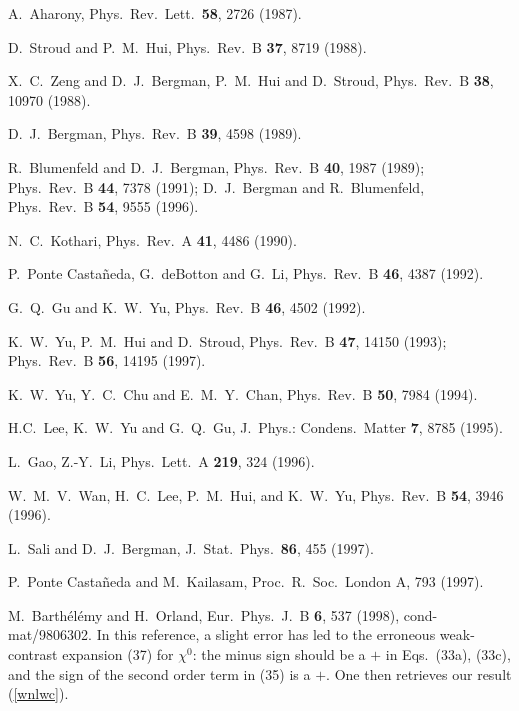 \begin{thebibliography}{99}
 A.\ Aharony, 
Phys.\ Rev.\ Lett.\ {\bf 58}, 2726 (1987).  

 D.\ Stroud and P.\ M.\ Hui, 
Phys.\ Rev.\ B {\bf 37}, 8719 (1988).

 X.\ C.\ Zeng and D.\ J.\ Bergman,  
P.\ M.\ Hui and D.\ Stroud, Phys.\ Rev.\ B {\bf 38}, 10970 (1988).

 D.\ J.\ Bergman, Phys.\ Rev.\ B {\bf 39}, 4598 (1989).

 R.\ Blumenfeld and D.\ J.\ Bergman, 
Phys.\ Rev.\ B {\bf 40}, 1987 (1989); Phys.\ Rev.\ B {\bf 44}, 7378 (1991);  
D.\ J.\ Bergman and R.\ Blumenfeld, Phys.\ Rev.\ B {\bf 54}, 9555 (1996).

 N.\ C.\ Kothari, Phys.\ Rev.\ A {\bf 41}, 4486 (1990).

 P.\ Ponte Casta\~neda, G.\ deBotton and G.\ Li, 
Phys.\ Rev.\ B {\bf 46}, 4387 (1992).

 G.\ Q.\ Gu and K.\ W.\ Yu, 
Phys.\ Rev.\  B {\bf 46}, 4502 (1992).

 K.\ W.\ Yu, P.\ M.\ Hui and D.\ Stroud, 
Phys.\ Rev.\ B {\bf 47}, 14150 (1993); Phys.\ Rev.\ B {\bf 56}, 14195 (1997).

 K.\ W.\ Yu, Y.\ C.\ Chu and E.\ M.\ Y.\ Chan, 
Phys.\ Rev.\ B {\bf 50}, 7984 (1994).

 H.\-C.\ Lee, K.\ W.\ Yu and G.\ Q.\ Gu, 
J.\ Phys.: Condens.\ Matter {\bf 7}, 8785 (1995).

 L.\ Gao, Z.-Y.\ Li, 
Phys.\ Lett.\ A {\bf 219}, 324 (1996).

 W.\ M.\ V.\ Wan, H.\ C.\ Lee, P.\ M.\ Hui, and K.\ W.\ Yu, 
Phys.\ Rev.\ B {\bf 54}, 3946 (1996).
 
 L.\ Sali and D.\ J.\ Bergman, 
J.\ Stat.\ Phys.\ {\bf 86}, 455 (1997).

 P.\ Ponte Casta\~neda and M.\ Kailasam, 
Proc.\ R.\ Soc.\ London A, 793 (1997).

 M.\ Barth\'el\'emy and H.\ Orland, 
Eur.\ Phys.\ J.\ B {\bf 6}, 537 (1998), cond-mat/9806302. 
In this reference, a slight error has led to the erroneous 
weak-contrast expansion (37) for $\chi^0$: the minus sign 
should be a $+$ in Eqs.\ (33a), (33c), and the sign of the 
second order term in (35) is a $+$. One then retrieves our 
result (\ref{wnlwc}).


\end{thebibliography}
